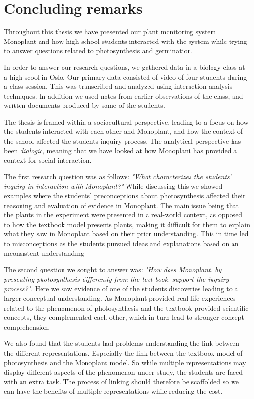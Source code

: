 \chapter{Concluding remarks}
Throughout this thesis we have presented our plant monitoring system Monoplant and how high-school students interacted with the system while trying to answer questions related to photosynthesis and germination. 

In order to answer our research questions, we gathered data in a biology class at a high-scool in Oslo. Our primary data consisted of video of four students during a class session. This was transcribed and analyzed using interaction analysis techniques. In addition we used notes from earlier observations of the class, and written documents produced by some of the students. 

The thesis is framed within a sociocultural perspective, leading to a focus on how the students interacted with each other and Monoplant, and how the context of the school affected the students inquiry process. The analytical perspective has been \emph{dialogic}, meaning that we have looked at how Monoplant has provided a context for social interaction. 

The first research question was as follows: \emph{"What characterizes the students’ inquiry in interaction with Monoplant?"} While discussing this we showed examples where the students' preconceptions about photosynthesis affected their reasoning and evaluation of evidence in Monoplant. The main issue being that the plants in the experiment were presented in a real-world context, as opposed to how the textbook model presents plants, making it difficult for them to explain what they saw in Monoplant based on their prior understanding. This in time led to misconceptions as the students pursued ideas and explanations based on an inconsistent understanding.


The second question we sought to answer was: \emph{"How does Monoplant, by presenting photosynthesis differently from the text book, support the inquiry process?"}. Here we saw evidence of one of the students discoveries leading to a larger conceptual understanding. As Monoplant provided real life experiences related to the phenomenon of photosynthesis and the textbook provided scientific concepts, they complemented each other, which in turn lead to stronger concept comprehension. 

We also found that the students had problems understanding the link between the different representations. Especially the link between the textbook model of photosynthesis and the Monoplant model. So while multiple representations may display different aspects of the phenomenon under study, the students are faced with an extra task. The process of linking should therefore be scaffolded so we can have the benefits of multiple representations while reducing the cost. 

